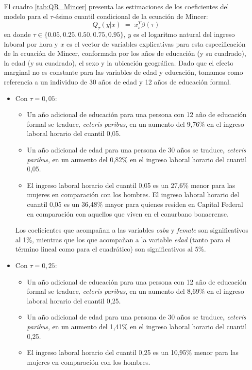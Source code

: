 \documentclass[11pt]{article}
\begin{document}
El cuadro \ref{tab:QR_Mincer} presenta las estimaciones de los coeficientes del modelo para el $\tau$-ésimo cuantil condicional de la ecuación de Mincer:
\[
Q_{\tau}(y|x)\;=\;x_{i}^{T}\beta(\tau)
\]
en donde $\tau\in\{0.05,0.25,0.50,0.75,0.95\}$, $y$ es el logaritmo natural del ingreso laboral por hora y $x$ es el vector de variables explicativas para esta especificación de la ecuación de Mincer, conformada por los años de educación (y su cuadrado), la edad (y su cuadrado), el sexo y la ubicación geográfica. Dado que el efecto marginal no es constante para las variables de edad y educación, tomamos como referencia a un individuo de 30 años de edad y 12 años de educación formal.
\begin{itemize}
    \item Con $\tau=0,05$:
    \begin{itemize}
        \item Un año adicional de educación para una persona con 12 año de educación formal se traduce, \emph{ceteris paribus}, en un aumento del 9,76\% en el ingreso laboral horario del cuantil 0,05.
        \item Un año adicional de edad para una persona de 30 años se traduce, \emph{ceteris paribus}, en un aumento del 0,82\% en el ingreso laboral horario del cuantil 0,05.
        \item El ingreso laboral horario del cuantil 0,05 es un 27,6\% menor para las mujeres en comparación con los hombres.
        El ingreso laboral horario del cuantil 0,05 es un 36,48\% mayor para quienes residen en Capital Federal en comparación con aquellos que viven en el conurbano bonaerense.
    \end{itemize}
    Los coeficientes que acompañan a las variables \emph{caba} y \emph{female} son significativos al 1\%, mientras que los que acompañan a la variable \emph{edad} (tanto para el término lineal como para el cuadrático) son significativos al 5\%.
    \item Con $\tau=0,25$:
    \begin{itemize}
        \item Un año adicional de educación para una persona con 12 año de educación formal se traduce, \emph{ceteris paribus}, en un aumento del 8,69\% en el ingreso laboral horario del cuantil 0,25.
        \item Un año adicional de edad para una persona de 30 años se traduce, \emph{ceteris paribus}, en un aumento del 1,41\% en el ingreso laboral horario del cuantil 0,25.
        \item El ingreso laboral horario del cuantil 0,25 es un 10,95\% menor para las mujeres en comparación con los hombres.

\end{itemize}
\end{itemize}
\end{document}
